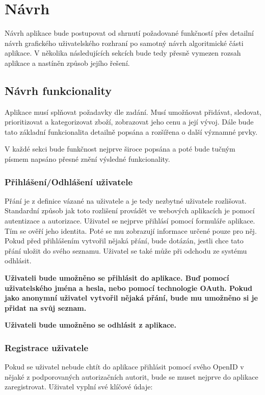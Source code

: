 \chapter{Návrh}
Návrh aplikace bude postupovat od shrnutí požadované funkčností přes detailní návrh grafického uživatelského rozhraní po samotný návrh algoritmické části aplikace. V několika následujících sekcích bude tedy přesně vymezen rozsah aplikace a nastíněn způsob jejího řešení.

\section{Návrh funkcionality}
\label{sec:navrh-funkcionality}
Aplikace musí splňovat požadavky dle zadání. Musí umožňovat přidávat, sledovat, prioritizovat a kategorizovat zboží, zobrazovat jeho cenu a její vývoj. Dále bude tato základní funkcionalita detailně popsána a rozšířena o další významné prvky.

V každé sekci bude funkčnost nejprve široce popsána a poté bude tučným písmem napsáno přesné znění výsledné funkcionality.

\subsection{Přihlášení/Odhlášení uživatele}
Přání je z definice vázané na uživatele a je tedy nezbytné uživatele rozlišovat. Standardní způsob jak toto rozlišení provádět ve webových aplikacích je pomocí autentizace a autorizace. Uživatel se nejprve přihlásí pomocí formuláře aplikace. Tím se ověří jeho identita. Poté se mu zobrazují informace určené pouze pro něj. Pokud před přihlášením vytvořil nějaká přání, bude dotázán, jestli chce tato přání uložit do svého seznamu. Uživatel se také může při odchodu ze systému odhlásit.

\textbf{Uživateli bude umožněno se přihlásit do aplikace. Buď pomocí uživatelského jména a hesla, nebo pomocí technologie OAuth. Pokud jako anonymní uživatel vytvořil nějaká přání, bude mu umožněno si je přidat na svůj seznam.}

\textbf{Uživateli bude umožněno se odhlásit z aplikace.}

\subsection{Registrace uživatele}
Pokud se uživatel nebude chtít do aplikace přihlásit pomocí svého OpenID v nějaké z podporovaných autorizačních autorit, bude se muset nejprve do aplikace zaregistrovat. Uživatel vyplní své klíčové údaje:

